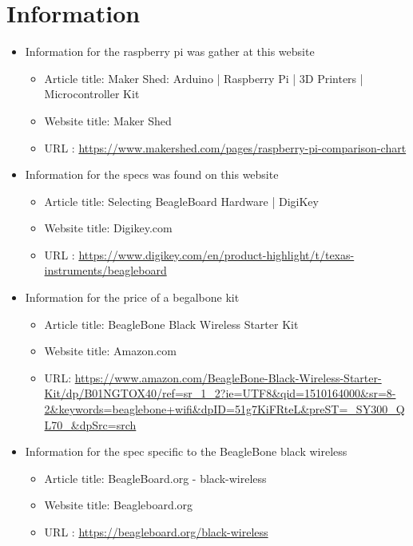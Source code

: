 \documentclass{article}
\begin{document}
\section{Information}

\begin{thebibliography}{56}

    \begin{itemize}
        \item Information for the raspberry pi was gather at this website
        \begin{itemize}
            \item Article title: Maker Shed: Arduino | Raspberry Pi | 3D Printers | Microcontroller Kit
            \item Website title: Maker Shed
            \item URL          : \url{https://www.makershed.com/pages/raspberry-pi-comparison-chart}
        \end{itemize}
    \end{itemize}

    \begin{itemize}
        \item Information for the specs was found on this website
        \begin{itemize}
            \item Article title: Selecting BeagleBoard Hardware | DigiKey
            \item Website title: Digikey.com
            \item URL          : \url{https://www.digikey.com/en/product-highlight/t/texas-instruments/beagleboard}
        \end{itemize}

        \item Information for the price of a begalbone kit
        \begin{itemize}
            \item Article title: BeagleBone Black Wireless Starter Kit
            \item Website title: Amazon.com
            \item URL: \url{https://www.amazon.com/BeagleBone-Black-Wireless-Starter-Kit/dp/B01NGTOX40/ref=sr_1_2?ie=UTF8&qid=1510164000&sr=8-2&keywords=beaglebone+wifi&dpID=51g7KiFRteL&preST=_SY300_QL70_&dpSrc=srch}
        \end{itemize}

        \item Information for the spec specific to the BeagleBone black wireless
        \begin{itemize}
            \item Article title: BeagleBoard.org - black-wireless
            \item Website title: Beagleboard.org
            \item URL          : \url{https://beagleboard.org/black-wireless}
        \end{itemize}


\end{itemize}
\end{thebibliography}
\end{document}
